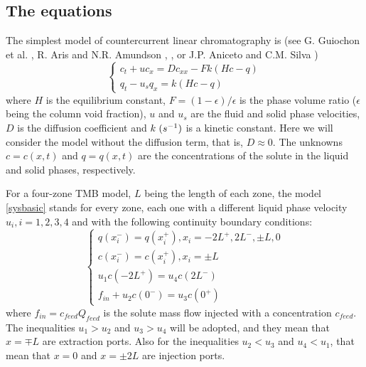 \documentclass[a4paper]{article}
\numberwithin{equation}{section}
\begin{document}
\subsection{The equations}
The simplest model of countercurrent linear chromatography is (see G. Guiochon et al. \cite{Guiochon2003}, R. Aris and N.R. Amundson \cite{ArisAmundson1973}, \cite{Grosfils}, or J.P. Aniceto and C.M. Silva \cite{Aniceto})
\begin{equation}\label{sysbasic}
\begin{cases}
    c_t+u c_x=D c_{xx}-Fk(Hc-q) \\
    q_t-u_s q_x=k(Hc-q)
\end{cases}
\end{equation}
where $H$ is the equilibrium constant, $F=(1-\epsilon)/\epsilon$ is the phase volume ratio ($\epsilon$ being the column void fraction), $u$ and $u_s$ are the fluid and solid phase velocities, $D$ is the diffusion coefficient and $k \hspace{1mm} (s^{-1})$ is a kinetic constant. Here we will consider the model without the diffusion term, that is, $D \approx 0$. The unknowns $c=c(x,t)$ and $q=q(x,t)$ are the concentrations of the solute in the liquid and solid phases, respectively.

For a four-zone TMB model, $L$ being the length of each zone, the model \eqref{sysbasic} stands for every zone, each one with a different liquid phase velocity $u_i, i=1, 2, 3, 4$ and with the following continuity boundary conditions:
\begin{equation}\label{bcbasic}
\begin{cases}
    q(x_i^{-})=q(x_i^{+}), x_i=-2L^{+}, 2L^{-}, \pm L, 0\\ c(x_i^{-})=c(x_i^{+}), x_i=\pm L \\ u_1 c(-2L^{+})=u_4c(2L^{-}) \\ f_{in}+u_2 c(0^{-})=u_3c(0^{+})
\end{cases}
\end{equation}
where $f_{in}=c_{feed} Q_{feed}$ is the solute mass flow injected with a concentration $c_{feed}$. The inequalities $u_1>u_2$ and $u_3>u_4$ will be adopted, and they mean that $x=\mp L$ are extraction ports. Also for the inequalities $u_2<u_3$ and $u_4<u_1$, that mean that $x=0$ and $x=\pm 2L$ are injection ports.
\end{document}

